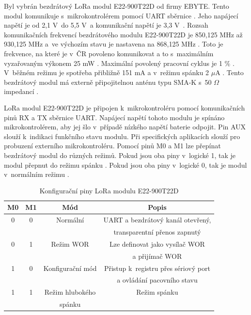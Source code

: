 Byl vybrán bezdrátový LoRa modul E22-900T22D od firmy EBYTE. Tento modul komunikuje s~mikrokontrolérem pomocí UART sběrnice \cite{LoRa_ebyte}. Jeho napájecí napětí je od 
2,1 V~do 5,5 V~a komunikační napětí je 3,3 V~\cite{LoRa_ebyte}. Rozsah komunikačních frekvencí bezdrátového modulu E22-900T22D je 850,125 MHz až 930,125 MHz a~ve výchozím 
stavu je nastavena na 868,125 MHz \cite{LoRa_ebyte}. Toto je frekvence, na které je v~ČR povoleno komunikovat a to s~maximálním vyzařovaným výkonem 25 mW \cite{CTU}. 
Maximální povolený pracovní cyklus je 1 \% \cite{CTU}. %
V~běžném režimu je spotřeba přibližně 151 mA a v~režimu spánku 2 $\mu$A \cite{LoRa_ebyte}. Tento bezdrátový modul má externě připojitelnou anténu typu SMA-K s~50 $\Omega$ 
impedancí \cite{LoRa_ebyte}.

LoRa modul E22-900T22D je připojen k~mikrokontroléru pomocí komunikačních pinů RX a TX sběrnice UART. Napájecí napětí tohoto modulu je spínáno mikrokontrolérem, aby jej 
šlo v~případě nízkého napětí baterie odpojit. Pin AUX slouží k~indikaci funkčního stavu modulu. Při specifických aplikacích slouží pro probuzení externího mikrokontroléru. 
Pomocí pinů M0 a M1 lze přepínat bezdrátový modul do různých režimů. Pokud jsou oba piny v~logické 1, 
tak je modul přepnut do režimu spánku \cite{LoRa_ebyte}. Pokud jsou oba piny v~logické 0, tak je modul v~normálním režimu \cite{LoRa_ebyte}. 

\begin{table}[!h]
  \caption[Konfigurační piny LoRa modulu E22-900T22D]{Konfigurační piny LoRa modulu E22-900T22D \cite{LoRa_ebyte}}
  \begin{center}
  	\small
	  \begin{tabular}{|c|c|c|c|}
	    \hline
	    \textbf{M0}	& \textbf{M1}	& \textbf{Mód} & \textbf{Popis} \\
	    \hline
	    0	& 0 & Normální & UART a bezdrátový kanál otevřený, \\ 
      & & &transparentní přenos zapnutý \\ 
	    \hline
	    0	& 1 & Režim WOR & Lze definovat jako vysílač WOR \\
      & & & a přijímač WOR \\ 
	    \hline
	    1 & 0 & Konfigurační mód & Přistup k~registru přes sériový port \\
      & & & a ovládání pacovního stavu \\
	    \hline
      1 & 1 & Režim hlubokého & Režim spánku \\
      & & spánku & \\
	    \hline
	  \end{tabular}
  \end{center}
\end{table}

